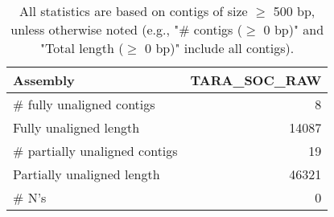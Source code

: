 \documentclass[12pt,a4paper]{article}
\begin{document}
\begin{table}[ht]
\begin{center}
\caption{All statistics are based on contigs of size $\geq$ 500 bp, unless otherwise noted (e.g., "\# contigs ($\geq$ 0 bp)" and "Total length ($\geq$ 0 bp)" include all contigs).}
\begin{tabular}{|l*{1}{|r}|}
\hline
Assembly & TARA\_SOC\_RAW \\ \hline
\# fully unaligned contigs & 8 \\ \hline
Fully unaligned length & 14087 \\ \hline
\# partially unaligned contigs & 19 \\ \hline
Partially unaligned length & 46321 \\ \hline
\# N's & 0 \\ \hline
\end{tabular}
\end{center}
\end{table}
\end{document}
